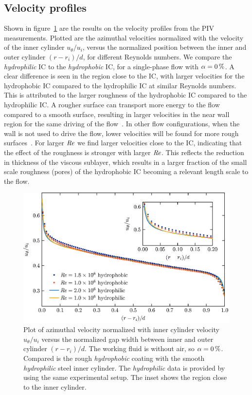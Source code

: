 \subsection{Velocity profiles}
Shown in figure~\ref{fig:PIVplot} are the results on the velocity profiles from the PIV measurements. Plotted are the azimuthal velocities normalized with the velocity of the inner cylinder $u_\theta / u_i$, versus the normalized position between the inner and outer cylinder $(r - r_i) / d$, for different Reynolds numbers. We compare the \textit{hydrophilic} IC to the \textit{hydrophobic} IC, for a single-phase flow with $\alpha = \SI{0}{\percent}$. A clear difference is seen in the region close to the IC, with larger velocities for the {hydrophobic} IC compared to the hydrophilic IC at similar Reynolds numbers. This is attributed to the larger roughness of the {hydrophobic} IC compared to the hydrophilic IC. A rougher surface can transport more energy to the flow compared to a smooth surface, resulting in larger velocities in the near wall region for the same driving of the flow~\citep{Zhu2018}. In other flow configurations, when the wall is not used to drive the flow, lower velocities will be found for more rough surfaces~\citep{Flack2010,MacDonald2016,Busse2017}. For larger $\mbox{\textit{Re}}$ we find larger velocities close to the IC, indicating that the effect of the roughness is stronger with larger $\mbox{\textit{Re}}$. This reflects the reduction in thickness of the viscous sublayer, which results in a larger fraction of the small scale roughness (pores) of the {hydrophobic} IC becoming a relevant length scale to the flow.

\begin{figure}
\centering \includegraphics{Figures/fig10} \caption{Plot of azimuthal velocity normalized with inner cylinder velocity $u_\theta / u_i$ versus the normalized gap width between inner and outer cylinder $(r-r_i) / d$. The working fluid is without air, so $\alpha = \SI{0}{\percent}$. Compared is the rough \textit{hydrophobic} coating with the smooth \textit{hydrophilic} steel inner cylinder. The \textit{hydrophilic} data is provided by~\cite{hui13} using the same experimental setup. The inset shows the region close to the inner cylinder. }\label{fig:PIVplot}
\end{figure}
